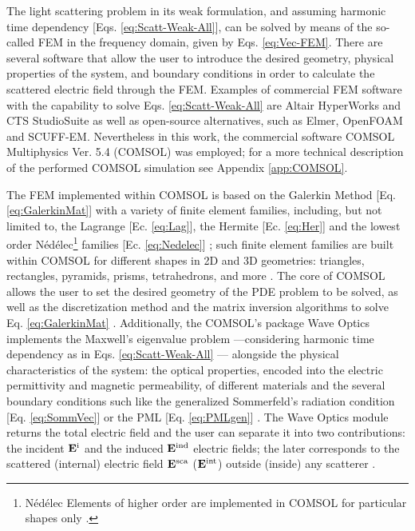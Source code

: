 
The light scattering problem in its weak formulation, and assuming harmonic time dependency [Eqs. \eqref{eq:Scatt-Weak-All}], can be solved by means of the so-called FEM in the frequency domain, given by Eqs. \eqref{eq:Vec-FEM}. There are several software that allow the user to introduce the desired geometry, physical properties of the system, and boundary conditions in order to calculate the scattered electric field through the FEM. Examples of commercial FEM software with the capability to solve Eqs. \eqref{eq:Scatt-Weak-All} are Altair HyperWorks and CTS StudioSuite as well as open-source alternatives, such as Elmer, OpenFOAM and SCUFF-EM. Nevertheless in this work, the commercial software COMSOL Multiphysics\texttrademark{} Ver. 5.4 (COMSOL) was employed; for a more technical description of the performed COMSOL simulation see Appendix \ref{app:COMSOL}.

The FEM implemented within COMSOL is based on the Galerkin Method [Eq. \eqref{eq:GalerkinMat}] with a variety of finite element families, including, but not limited to, the Lagrange [Ec. \eqref{eq:Lag}], the Hermite [Ec. \eqref{eq:Her}] and the lowest order Nédélec\footnote{Nédélec Elements of higher order are implemented in COMSOL for particular shapes only \cite{comsol_doc}.} families [Ec. \eqref{eq:Nedelec}] \cite{comsol_doc}; such finite element families are built within COMSOL for different shapes in 2D and 3D geometries: triangles, rectangles, pyramids,  prisms, tetrahedrons, and more \cite{comsol_doc}. The core of COMSOL allows the user to set the desired geometry of the PDE problem to be solved, as well as the discretization method and the matrix inversion algorithms to solve Eq. \eqref{eq:GalerkinMat} \cite{comsol_doc}. Additionally, the COMSOL's package Wave Optics implements the Maxwell's eigenvalue problem ---considering harmonic time dependency as in Eqs. \eqref{eq:Scatt-Weak-All} \cite{comsol_doc}--- alongside the physical characteristics of the system: the optical properties, encoded into the electric permittivity and magnetic permeability, of different materials and the several boundary conditions such like the generalized Sommerfeld's radiation condition [Eq. \eqref{eq:SommVec}] or the PML [Eq. \eqref{eq:PMLgen}] \cite{comsol_wave}. The Wave Optics module returns the total electric field and the user can separate it into two contributions: the incident  $\vb{E}^\text{i}$ and the induced  $\vb{E}^\text{ind}$ electric fields; the later corresponds to the scattered (internal) electric field  $\vb{E}^\text{sca}$ ($\vb{E}^\text{int}$) outside (inside) any scatterer \cite{comsol_wave}.

